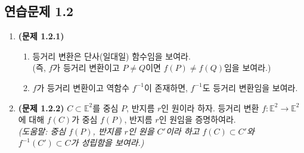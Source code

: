 \documentclass{article}
\begin{document}
\medskip
\subsection*{연습문제 1.2}

\begin{enumerate}
  \item \textbf{(문제 1.2.1)}
    \begin{enumerate}
      \item[(a)] 등거리 변환은 단사(일대일) 함수임을 보여라.\\
        (즉, $f$가 등거리 변환이고 $P \neq Q$이면 $f(P) \neq f(Q)$임을 보여라.)
      \item[(b)] $f$가 등거리 변환이고 역함수 $f^{-1}$이 존재하면, $f^{-1}$도 등거리 변환임을 보여라.
    \end{enumerate}

  \item \textbf{(문제 1.2.2)}\quad
    $C \subset \mathbb{E}^2$를 중심 $P$, 반지름 $r$인 원이라 하자.
    등거리 변환 $f : \mathbb{E}^2 \to \mathbb{E}^2$에 대해
    $f(C)$가 중심 $f(P)$, 반지름 $r$인 원임을 증명하여라.\\
    \textit{(도움말: 중심 $f(P)$, 반지름 $r$인 원을 $C'$이라 하고
    $f(C) \subset C'$와 $f^{-1}(C') \subset C$가 성립함을 보여라.)}
\end{enumerate}
\end{document}
